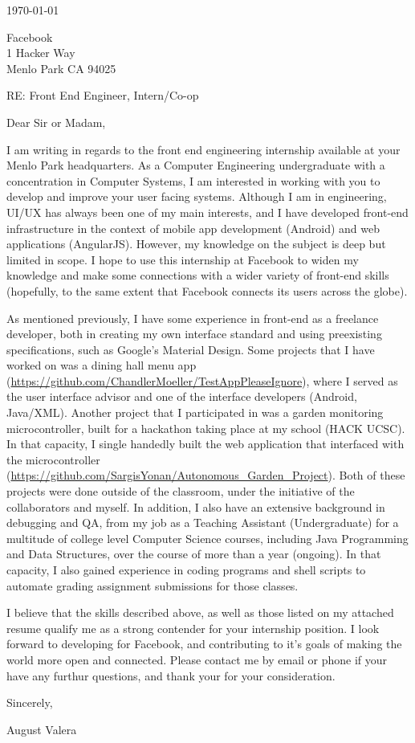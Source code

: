 \documentclass[11pt]{article}
\author{August Valera}
\begin{document}

\today

\vspace{12pt}
Facebook \\
1 Hacker Way \\
Menlo Park CA 94025

\vspace{12pt}

RE: Front End Engineer, Intern/Co-op

\vspace{12pt}
Dear Sir or Madam,

\vspace{12pt}
I am writing in regards to the front end engineering internship available at
your Menlo Park headquarters. As a Computer Engineering undergraduate with a
concentration in Computer Systems, I am interested in working with you to
develop and improve your user facing systems. Although I am in engineering,
UI/UX has always been one of my main interests, and I have developed front-end
infrastructure in the context of mobile app development (Android) and web
applications (AngularJS). However, my knowledge on the subject is deep but
limited in scope. I hope to use this internship at Facebook to widen my
knowledge and make some connections with a wider variety of front-end skills
(hopefully, to the same extent that Facebook connects its users across the
globe).

As mentioned previously, I have some experience in front-end as a freelance
developer, both in creating my own interface standard and using preexisting
specifications, such as Google's Material Design. Some projects that I have
worked on was a dining hall menu app
(\url{https://github.com/ChandlerMoeller/TestAppPleaseIgnore}), where I served
as the user interface advisor and one of the interface developers (Android,
Java/XML). Another project that I participated in was a garden monitoring
microcontroller, built for a hackathon taking place at my school (HACK UCSC). In
that capacity, I single handedly built the web application that interfaced with
the microcontroller
(\url{https://github.com/SargisYonan/Autonomous_Garden_Project}). Both of these
projects were done outside of the classroom, under the initiative of the
collaborators and myself. In addition, I also have an extensive background in
debugging and QA, from my job as a Teaching Assistant (Undergraduate) for a
multitude of college level Computer Science courses, including Java
Programming and Data Structures, over the course of more than a year (ongoing).
In that capacity, I also gained experience in coding programs and shell scripts
to automate grading assignment submissions for those classes.

I believe that the skills described above, as well as those listed on my
attached resume qualify me as a strong contender for your internship position. I
look forward to developing for Facebook, and contributing to it's goals of
making the world more open and connected. Please contact me by email or phone if
your have any furthur questions, and thank your for your consideration.

\vspace{12pt}
Sincerely,

\vspace{24pt}
August Valera
\end{document}
